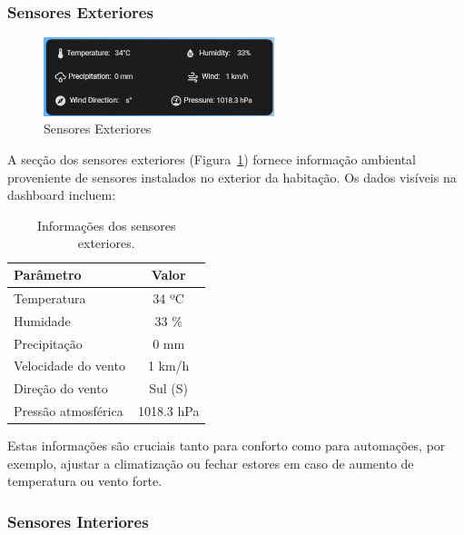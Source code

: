 \subsubsection{Sensores Exteriores}

\begin{figure}[H]
    \centering
    \includegraphics[width=0.6\textwidth]{images/sensores_exteriores.png}
    \caption{Sensores Exteriores}
    \label{fig:sensores_exteriores.png}
\end{figure}

A secção dos sensores exteriores (Figura~\ref{fig:sensores_exteriores.png}) fornece informação ambiental proveniente de sensores instalados no exterior da habitação. Os dados visíveis na dashboard incluem:

\begin{table}[H]
\centering
\begin{tabular}{|l|c|}
\hline
\textbf{Parâmetro}             & \textbf{Valor}       \\
\hline
Temperatura                   & 34 ºC                \\
Humidade                      & 33 \%                \\
Precipitação                  & 0 mm                 \\
Velocidade do vento           & 1 km/h               \\
Direção do vento              & Sul (S)              \\
Pressão atmosférica           & 1018.3 hPa           \\
\hline
\end{tabular}
\caption{Informações dos sensores exteriores.}
\end{table}

Estas informações são cruciais tanto para conforto como para automações, por exemplo, ajustar a climatização ou fechar estores em caso de aumento de temperatura ou vento forte.

\newpage

\subsubsection{Sensores Interiores}

